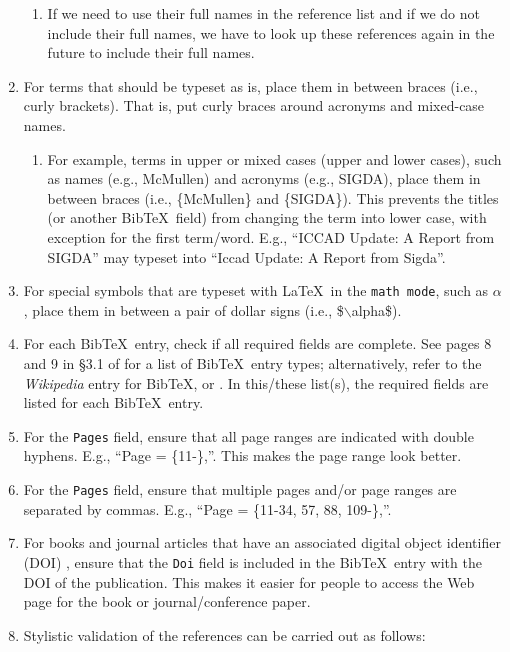 \documentclass[letter,12pt]{article}
\begin{document}
\begin{enumerate}
\begin{enumerate}
	\item If we need to use their full names in the reference list and if we do not include their full names, we have to look up these references again in the future to include their full names.
	\end{enumerate}
\item For terms that should be typeset as is, place them in between braces (i.e., curly brackets). That is, put curly braces around acronyms and mixed-case names. \vspace{-0.3cm}
	\begin{enumerate} \itemsep -2pt
	\item For example, terms in upper or mixed cases (upper and lower cases), such as names (e.g., McMullen) and acronyms (e.g., SIGDA), place them in between braces (i.e., \{McMullen\} and \{SIGDA\}). This prevents the titles (or another {\sc Bib}\TeX\ field) from changing the term into lower case, with exception for the first term/word. E.g., ``ICCAD Update: A Report from SIGDA'' may typeset into ``Iccad Update: A Report from Sigda''.
	\end{enumerate}
\item For special symbols that are typeset with \LaTeX\ in the {\tt math mode}, such as $\alpha$, place them in between a pair of dollar signs (i.e., \$$\backslash$alpha\$).
\item For each {\sc Bib}\TeX\ entry, check if all required fields are complete. See pages 8 and 9 in \S3.1 of \cite{Patashnik1988} for a list of {\sc Bib}\TeX\ entry types; alternatively, refer to the {\it Wikipedia} entry for {\sc Bib}\TeX, or \cite[\S12.2.1, pp. 230--231]{Kopka2004}. In this/these list(s), the required fields are listed for each {\sc Bib}\TeX\ entry.
\item For the {\tt Pages} field, ensure that all page ranges are indicated with double hyphens. E.g., ``Page = \{11-\},''. This makes the page range look better.
\item For the {\tt Pages} field, ensure that multiple pages and/or page ranges are separated by commas. E.g., ``Page = \{11-34, 57, 88, 109-\},''.
\item For books and journal articles that have an associated digital object identifier (DOI) \cite{InternationalDOIFoundationStaff2017}, ensure that the {\tt Doi} field is included in the {\sc Bib}\TeX\ entry with the DOI of the publication. This makes it easier for people to access the Web page for the book or journal/conference paper.
\item Stylistic validation of the references can be carried out as follows: \vspace{-0.3cm}

\end{enumerate}
\end{document}
